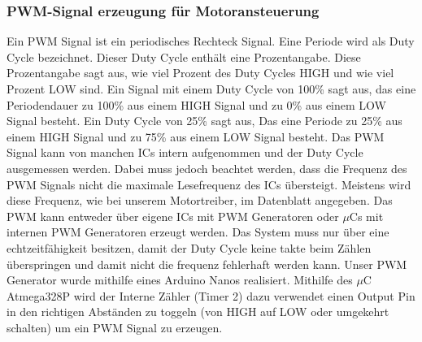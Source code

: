 \subsubsection{PWM-Signal erzeugung für Motoransteuerung}
Ein PWM Signal ist ein periodisches Rechteck Signal. Eine Periode wird als Duty Cycle bezeichnet. Dieser Duty Cycle enthält eine Prozentangabe. Diese Prozentangabe sagt aus, wie viel Prozent des Duty Cycles HIGH und wie viel Prozent LOW sind. Ein Signal mit einem Duty Cycle von 100\% sagt aus, das eine Periodendauer zu 100\% aus einem HIGH Signal und zu 0\% aus einem LOW Signal besteht. Ein Duty Cycle von 25\% sagt aus, Das eine Periode zu 25\% aus einem HIGH Signal und zu 75\% aus einem LOW Signal besteht. Das PWM Signal kann von manchen ICs intern aufgenommen und der Duty Cycle ausgemessen werden. Dabei muss jedoch beachtet werden, dass die Frequenz des PWM Signals nicht die maximale Lesefrequenz des ICs übersteigt. Meistens wird diese Frequenz, wie bei unserem Motortreiber, im Datenblatt angegeben. Das PWM kann entweder über eigene ICs mit PWM Generatoren oder $\mu$Cs mit internen PWM Generatoren erzeugt werden. Das System muss nur über eine echtzeitfähigkeit besitzen, damit der Duty Cycle keine takte beim Zählen überspringen und damit nicht die frequenz fehlerhaft werden kann. 
Unser PWM Generator wurde mithilfe eines Arduino Nanos realisiert. Mithilfe des $\mu$C Atmega328P wird der Interne Zähler (Timer 2) dazu verwendet einen Output Pin in den richtigen Abständen zu toggeln (von HIGH auf LOW oder umgekehrt schalten) um ein PWM Signal zu erzeugen.


